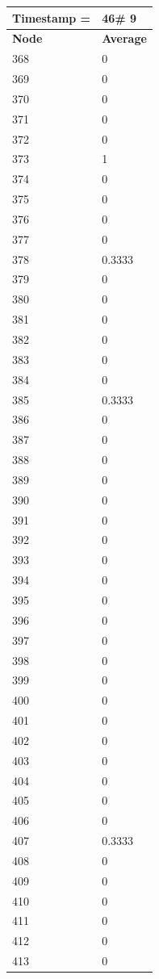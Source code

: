 \begin{tabular}{|l||l|}
\hline
\textbf{Timestamp =} & \textbf{46}\# 9\\\hline
	\textbf{Node} & \textbf{Average} \\ \hline
\hline
	368 & 0 \\ \hline
	369 & 0 \\ \hline
	370 & 0 \\ \hline
	371 & 0 \\ \hline
	372 & 0 \\ \hline
	373 & 1 \\ \hline
	374 & 0 \\ \hline
	375 & 0 \\ \hline
	376 & 0 \\ \hline
	377 & 0 \\ \hline
	378 & 0.3333 \\ \hline
	379 & 0 \\ \hline
	380 & 0 \\ \hline
	381 & 0 \\ \hline
	382 & 0 \\ \hline
	383 & 0 \\ \hline
	384 & 0 \\ \hline
	385 & 0.3333 \\ \hline
	386 & 0 \\ \hline
	387 & 0 \\ \hline
	388 & 0 \\ \hline
	389 & 0 \\ \hline
	390 & 0 \\ \hline
	391 & 0 \\ \hline
	392 & 0 \\ \hline
	393 & 0 \\ \hline
	394 & 0 \\ \hline
	395 & 0 \\ \hline
	396 & 0 \\ \hline
	397 & 0 \\ \hline
	398 & 0 \\ \hline
	399 & 0 \\ \hline
	400 & 0 \\ \hline
	401 & 0 \\ \hline
	402 & 0 \\ \hline
	403 & 0 \\ \hline
	404 & 0 \\ \hline
	405 & 0 \\ \hline
	406 & 0 \\ \hline
	407 & 0.3333 \\ \hline
	408 & 0 \\ \hline
	409 & 0 \\ \hline
	410 & 0 \\ \hline
	411 & 0 \\ \hline
	412 & 0 \\ \hline
	413 & 0 \\ \hline
\end{tabular}

